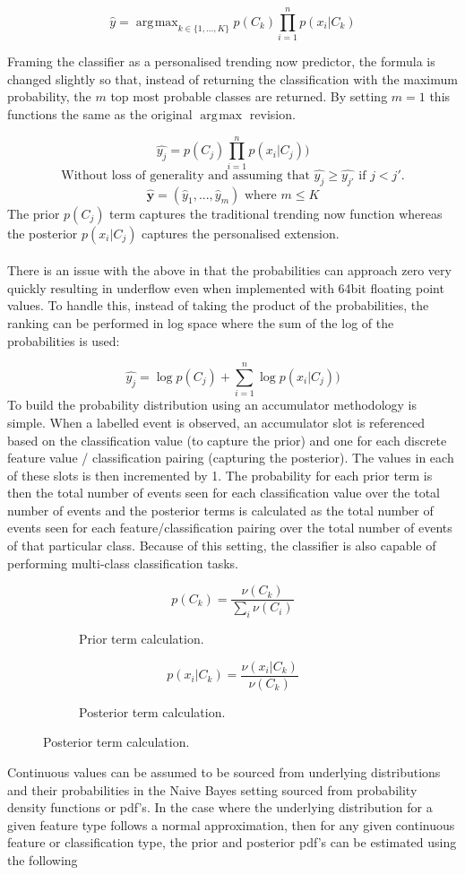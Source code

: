 \documentclass[a4paper,11pt]{scrreprt}
\DeclareMathOperator*{\argmax}{\arg\!\max}
\begin{document}
\[\hat{y}=\argmax_{k \in \{1,...,K\}} p(C_k)\prod_{i=1}^n p(x_i | C_k)\]

Framing the classifier as a personalised trending now predictor, the formula is changed slightly so that, instead of returning the classification with the maximum probability, the \(m\) top most probable classes are returned. By setting \(m=1\) this functions the same as the original \(\argmax\) revision. 

\[\hat{y_j}= p(C_j)\prod_{i=1}^n p(x_i | C_j))\]
\[\text{Without loss of generality and assuming that }  \hat{y_j} \geq \hat{y_{j'}} \text{ if } j < j'.\]
\[\mathbf{\hat{y}} = (\hat{y}_1, ..., \hat{y}_m) \text{ where } m \leq K\]
The prior \(p(C_j)\) term captures the traditional trending now function whereas the posterior \(p(x_i | C_j)\) captures the personalised extension.\\\\ There is an issue with the above in that the probabilities can approach zero very quickly resulting in underflow even when implemented with 64bit floating point values. To handle this, instead of taking the product of the probabilities, the ranking can be performed in log space where the sum of the log of the probabilities is used:

\[\hat{y_j}= \log p(C_j) + \sum_{i=1}^n \log p(x_i | C_j))\]
To build the probability distribution using an accumulator methodology is simple. When a labelled event is observed, an accumulator slot is referenced based on the classification value (to capture the prior) and one for each discrete feature value / classification pairing (capturing the posterior). The values in each of these slots is then incremented by 1. The probability for each prior term is then the total number of events seen for each classification value over the total number of events and the posterior terms is calculated as the total number of events seen for each feature/classification pairing over the total number of events of that particular class. Because of this setting, the classifier is also capable of performing multi-class classification tasks.

\begin{figure}[h!]
\begin{subfigure}[t]{2 in}
\[p(C_k) = \frac{\nu(C_k)}{\sum_{i} \nu(C_i)}\]
\caption{Prior term calculation.}
\end{subfigure}
\begin{subfigure}[t]{2 in}
\[p(x_i | C_k) = \frac{\nu(x_i | C_k)}{\nu(C_k)}\]
\caption{Posterior term calculation.}
\end{subfigure}
\end{figure}
Continuous values can be assumed to be sourced from underlying distributions and their probabilities in the Naive Bayes setting sourced from probability density functions or \acrshort{pdf}'s. In the case where the underlying distribution for a given feature type follows a normal approximation, then for any given continuous feature or classification type, the prior and posterior \acrshort{pdf}'s can be estimated using the following
\end{document}
